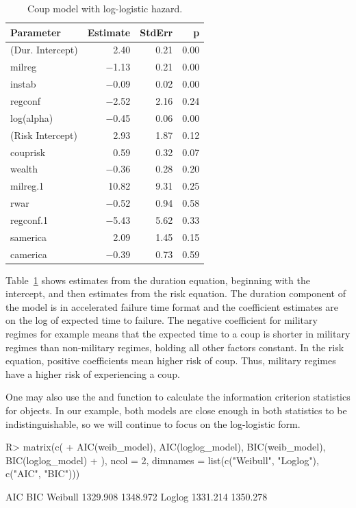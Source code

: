 \documentclass[article]{jss}
\begin{document}
\begin{table}[ht]
\centering
\begin{tabular}{lrrr}
  \hline
Parameter & Estimate & StdErr & p \\ 
  \hline
(Dur. Intercept) & 2.40 & 0.21 & 0.00 \\ 
  milreg & $-$1.13 & 0.21 & 0.00 \\ 
  instab & $-$0.09 & 0.02 & 0.00 \\ 
  regconf & $-$2.52 & 2.16 & 0.24 \\ 
  log(alpha) & $-$0.45 & 0.06 & 0.00 \\ 
  (Risk Intercept) & 2.93 & 1.87 & 0.12 \\ 
  couprisk & 0.59 & 0.32 & 0.07 \\ 
  wealth & $-$0.36 & 0.28 & 0.20 \\ 
  milreg.1 & 10.82 & 9.31 & 0.25 \\ 
  rwar & $-$0.52 & 0.94 & 0.58 \\ 
  regconf.1 & $-$5.43 & 5.62 & 0.33 \\ 
  samerica & 2.09 & 1.45 & 0.15 \\ 
  camerica & $-$0.39 & 0.73 & 0.59 \\ 
   \hline
\end{tabular}
\caption{Coup model with log-logistic hazard.} \label{loglog_table}
\end{table}

Table~\ref{loglog_table} shows estimates from the duration equation,
beginning with the intercept, and then estimates from the risk equation.
The duration component of the model is in accelerated failure time
format and the coefficient estimates are on the log of expected time to
failure. The negative coefficient for military regimes for example means
that the expected time to a coup is shorter in military regimes than
non-military regimes, holding all other factors constant. In the risk
equation, positive coefficients mean higher risk of coup. Thus, military
regimes have a higher risk of experiencing a coup.

One may also use the  and  function to calculate the
information criterion statistics for  objects. In our
example, both models are close enough in both statistics to be
indistinguishable, so we will continue to focus on the log-logistic
form.

\begin{CodeChunk}
\begin{CodeInput}
R> matrix(c(
+    AIC(weib_model), AIC(loglog_model), BIC(weib_model), BIC(loglog_model)
+    ), ncol = 2, dimnames = list(c("Weibull", "Loglog"), c("AIC", "BIC")))
\end{CodeInput}
\begin{CodeOutput}
             AIC      BIC
Weibull 1329.908 1348.972
Loglog  1331.214 1350.278
\end{CodeOutput}
\end{CodeChunk}
\end{document}
